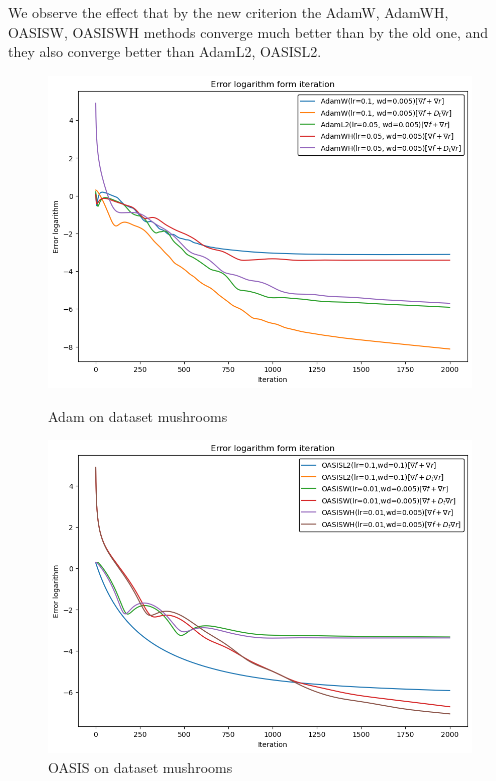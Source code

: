\documentclass{article}
\begin{document}
We observe the effect that by the new criterion the AdamW, AdamWH, OASISW, OASISWH methods converge much better than by the old one, and they also converge better than AdamL2, OASISL2.
\begin{figure}[H]
\begin{minipage}[h]{0.4\linewidth}
\centering 
\includegraphics[width=\textwidth]{pictures/mushrooms/adams_error.png}
\caption{Adam on dataset mushrooms}
    \label{fig:adams_error}
\end{minipage}
\hfill
\begin{minipage}[h]{0.4\linewidth}
\includegraphics[width=\textwidth]{pictures/mushrooms/oasis_error.png}
    \caption{OASIS on dataset mushrooms}
        \label{fig:oasis_error}
\end{minipage}
\label{fig:oasis_error}
\end{figure}
\end{document}
